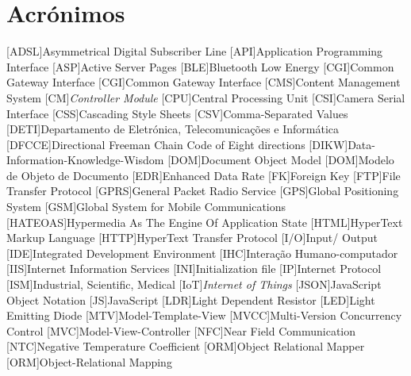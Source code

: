 
\chapter*{Acrónimos}

\begin{multicols}{2}
	
\begin{acronym}[RELAX NG]
	
	[ADSL]{Asymmetrical Digital Subscriber Line}
	[API]{Application Programming Interface}
	[ASP]{Active Server Pages}
	[BLE]{Bluetooth Low Energy}
	[CGI]{Common Gateway Interface}
	[CGI]{Common Gateway Interface}
	[CMS]{Content Management System}
	[CM]{\textit{Controller Module}}
	[CPU]{Central Processing Unit}
	[CSI]{Camera Serial Interface}
	[CSS]{Cascading Style Sheets}
	[CSV]{Comma-Separated Values}
	[DETI]{Departamento de Eletrónica, Telecomunicações e Informática}
	[DFCCE]{Directional Freeman Chain Code of Eight directions}
	[DIKW]{Data-Information-Knowledge-Wisdom}
	[DOM]{Document Object Model}
	[DOM]{Modelo de Objeto de Documento}
	[EDR]{Enhanced Data Rate}
	[FK]{Foreign Key}
	[FTP]{File Transfer Protocol}
	[GPRS]{General Packet Radio Service}
	[GPS]{Global Positioning System}
	[GSM]{Global System for Mobile Communications}
	[HATEOAS]{Hypermedia As The Engine Of Application State}
	[HTML]{HyperText Markup Language}
	[HTTP]{HyperText Transfer Protocol}
	[I/O]{Input/ Output}
	[IDE]{Integrated Development Environment}
	[IHC]{Interação Humano-computador}
	[IIS]{Internet Information Services}
	[INI]{Initialization file}
	[IP]{Internet Protocol}
	[ISM]{Industrial, Scientific, Medical}
	[IoT]{\textit{Internet of Things}}
	[JSON]{JavaScript Object Notation}
	[JS]{JavaScript}
	[LDR]{Light Dependent Resistor}
	[LED]{Light Emitting Diode}
	[MTV]{Model-Template-View}
	[MVCC]{Multi-Version Concurrency Control}
	[MVC]{Model-View-Controller}
	[NFC]{Near Field Communication}
	[NTC]{Negative Temperature Coefficient}
	[ORM]{Object Relational Mapper}
	[ORM]{Object-Relational Mapping}

\end{acronym}
\end{multicols}
